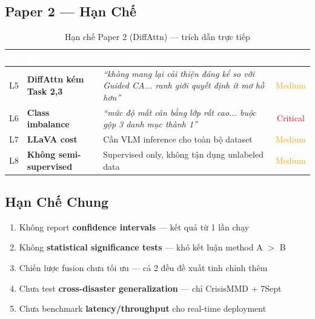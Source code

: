 \documentclass[12pt,a4paper]{article}
\begin{document}
\subsection{Paper 2 — Hạn Chế}

\begin{table}[H]
\centering
\caption{Hạn chế Paper 2 (DiffAttn) — trích dẫn trực tiếp}
\begin{tabularx}{\textwidth}{c >{\bfseries}l X c}
\toprule
\rowcolor{tableheader}
\textcolor{white}{\#} & \textcolor{white}{Hạn chế} & \textcolor{white}{Trích dẫn} & \textcolor{white}{Mức} \\
\midrule
L5 & DiffAttn kém Task 2,3 & \textit{``không mang lại cải thiện đáng kể so với Guided CA... ranh giới quyết định ít mơ hồ hơn''} & \textcolor{orange}{Medium} \\
L6 & Class imbalance & \textit{``mức độ mất cân bằng lớp rất cao... buộc gộp 3 danh mục thành 1''} & \textcolor{red}{Critical} \\
L7 & LLaVA cost & Cần VLM inference cho toàn bộ dataset & \textcolor{orange}{Medium} \\
L8 & Không semi-supervised & Supervised only, không tận dụng unlabeled data & \textcolor{orange}{Medium} \\
\bottomrule
\end{tabularx}
\end{table}

\subsection{Hạn Chế Chung}

\begin{warningbox}
\begin{enumerate}[leftmargin=*]
  \item Không report \textbf{confidence intervals} — kết quả từ 1 lần chạy
  \item Không \textbf{statistical significance tests} — khó kết luận method A $>$ B
  \item Chiến lược fusion chưa tối ưu — cả 2 đều đề xuất tinh chỉnh thêm
  \item Chưa test \textbf{cross-disaster generalization} — chỉ CrisisMMD + 7Sept
  \item Chưa benchmark \textbf{latency/throughput} cho real-time deployment
\end{enumerate}
\end{warningbox}
\end{document}
